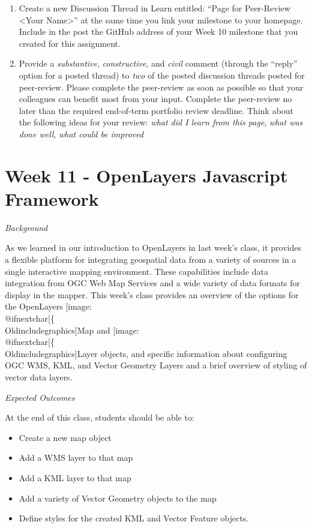 \documentclass[]{book}
\makeatletter
\providecommand{\tightlist}{%
  \setlength{\itemsep}{0pt}\setlength{\parskip}{0pt}}
\def\ScaleIfNeeded{%
  \ifdim\Gin@nat@width>.5\linewidth
    .5\linewidth
  \else
    \Gin@nat@width
  \fi
}
\let\Oldincludegraphics\texttt{[image: \%
 \\catcode`\\@=11\\relax\%
 \%\\gdef\\includegraphics\{\\@ifnextchar[\{\\Oldincludegraphics]}{\Oldincludegraphics[width=\ScaleIfNeeded]}}%
\gdef\texttt{[image: \\@ifnextchar[\{\\Oldincludegraphics]}{\Oldincludegraphics[max size={.75\textwidth}{.75\textheight}]}}%
\makeatother
\begin{document}
\begin{enumerate}
\def\labelenumi{\arabic{enumi}.}
\item
  Create a new Discussion Thread in Learn entitled: ``Page for
  Peer-Review \textless{}Your Name\textgreater{}'' at the same time you
  link your milestone to your homepage. Include in the post the GitHub
  address of your Week 10 milestone that you created for this
  assignment.
\item
  Provide a \emph{substantive}, \emph{constructive}, and \emph{civil}
  comment (through the ``reply'' option for a posted thread) to
  \emph{two} of the posted discussion threads posted for peer-review.
  Please complete the peer-review as soon as possible so that your
  colleagues can benefit most from your input. Complete the peer-review
  no later than the required end-of-term portfolio review deadline.
  Think about the following ideas for your review: \emph{what did I
  learn from this page}, \emph{what was done well}, \emph{what could be
  improved}
\end{enumerate}

\chapter{Week 11 - OpenLayers Javascript Framework}\label{week11}

\emph{Background}

As we learned in our introduction to OpenLayers in last week's class, it
provides a flexible platform for integrating geospatial data from a
variety of sources in a single interactive mapping environment. These
capabilities include data integration from OGC Web Map Services and a
wide variety of data formats for display in the mapper. This week's
class provides an overview of the options for the OpenLayers
\texttt{Map} and \texttt{Layer} objects, and specific information about
configuring OGC WMS, KML, and Vector Geometry Layers and a brief
overview of styling of vector data layers.

\emph{Expected Outcomes}

At the end of this class, students should be able to:

\begin{itemize}
\tightlist
\item
  Create a new map object
\item
  Add a WMS layer to that map
\item
  Add a KML layer to that map
\item
  Add a variety of Vector Geometry objects to the map
\item
  Define styles for the created KML and Vector Feature objects.
\end{itemize}
\end{document}
